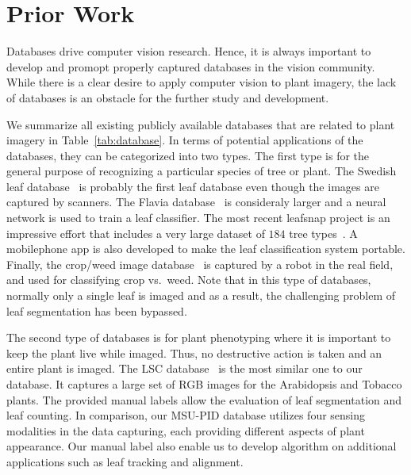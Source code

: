 \section{Prior Work} 
\label{sec:prior}

Databases drive computer vision research.
Hence, it is always important to develop and promopt properly captured databases in the vision community.
While there is a clear desire to apply computer vision to plant imagery, the lack of databases is an obstacle for the further study and development.

 We summarize all existing publicly available databases that are related to plant imagery in Table~\ref{tab:database}.
In terms of potential applications of the databases, they can be categorized into two types.
The first type is for the general purpose of recognizing a particular species of tree or plant.
The Swedish leaf database~\cite{soderkvist2001computer} is probably the first leaf database even though the images are captured by scanners. 
The Flavia database~\cite{wu2007leaf} is consideraly larger and a neural network is used to train a leaf classifier.
The most recent leafsnap project is an impressive effort that includes a very large dataset of $184$ tree types~\cite{kumar2012leafsnap}.
A mobilephone app is also developed to make the leaf classification system portable.
Finally, the crop/weed image database~\cite{haug2014crop} is captured by a robot in the real field, and used for classifying crop vs.~weed.
Note that in this type of databases, normally only a single leaf is imaged and as a result, the challenging problem of leaf segmentation has been bypassed.


The second type of databases is for plant phenotyping where it is important to keep the plant live while imaged.
Thus, no destructive action is taken and an entire plant is imaged.
The LSC database~\cite{scharr2014annotated} is the most similar one to our database.
It captures a large set of RGB images for the Arabidopsis and Tobacco plants.
The provided manual labels allow the evaluation of leaf segmentation and leaf counting.
In comparison, our MSU-PID database utilizes four sensing modalities in the data capturing, each providing different aspects of plant appearance.
Our manual label also enable us to develop algorithm on additional applications such as leaf tracking and alignment. 

